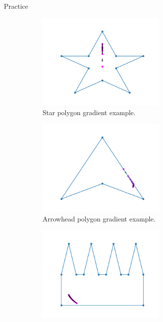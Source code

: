 \documentclass{beamer}
\begin{document}
\begin{frame}{Practice}
	\begin{figure}[h!]
		\centering
		\begin{subfigure}{0.45\textwidth}
			\centering
			\includegraphics[width = 0.7\textwidth]{Images/pentagram_gradient.png}
			\caption{Star polygon gradient example.}
			\label{fig:star_gradient}
		\end{subfigure}
		\begin{subfigure}{0.45\textwidth}
			\centering
			\includegraphics[width = 0.7\textwidth]{Images/concave_triangle_gradient.png}
			\caption{Arrowhead polygon gradient example.}
			\label{fig:concave_gradient}
		\end{subfigure}
		\begin{subfigure}{0.45\textwidth}
			\centering
			\includegraphics[width = 0.7\textwidth]{Images/comb_gradient.png}

\end{subfigure}
\end{figure}
\end{frame}
\end{document}
